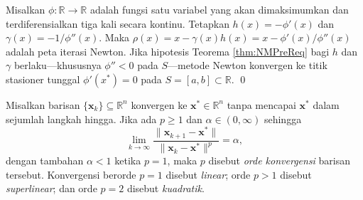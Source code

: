 \begin{corollary} Misalkan $\phi:\mathbb{R}\rightarrow\mathbb{R}$ adalah fungsi satu variabel yang akan dimaksimumkan dan terdiferensialkan tiga kali secara kontinu. Tetapkan $h(x)=-\phi'(x)$ dan $\gamma(x)=-1/\phi''(x)$. Maka
$\rho(x)=x-\gamma(x)h(x)=x-\phi'(x)/\phi''(x)$ adalah peta iterasi Newton. Jika hipotesis Teorema \ref{thm:NMPreReq} bagi $h$ dan $\gamma$ berlaku---khususnya $\phi''<0$ pada $S$---metode Newton konvergen ke titik stasioner tunggal $\phi'(x^*)=0$ pada $S=[a,b]\subset\mathbb{R}$. \hfill\qed
\label{cor:NMConverge}
\end{corollary}

\begin{definition} Misalkan barisan $\{\mathbf{x}_k\}\subseteq\mathbb{R}^n$ konvergen ke $\mathbf{x}^*\in\mathbb{R}^n$ tanpa mencapai $\mathbf{x}^*$ dalam sejumlah langkah hingga. Jika ada $p\geq1$ dan $\alpha\in(0,\infty)$ sehingga
\begin{equation}
\lim_{k\to\infty}\frac{\lVert\mathbf{x}_{k+1}-\mathbf{x}^*\rVert}{\lVert\mathbf{x}_k-\mathbf{x}^*\rVert^p}=\alpha,
\end{equation}
dengan tambahan $\alpha<1$ ketika $p=1$, maka $p$ disebut \textit{orde konvergensi} barisan tersebut. Konvergensi berorde $p=1$ disebut \textit{linear}; orde $p>1$ disebut \textit{superlinear}; dan orde $p=2$ disebut \textit{kuadratik}.
\end{definition}

